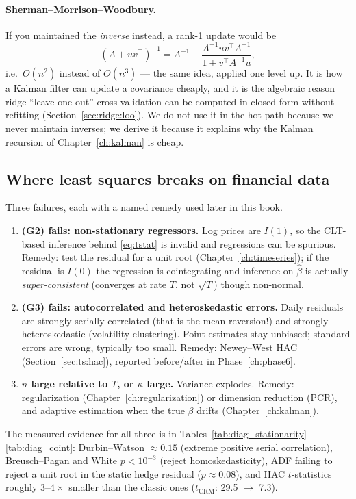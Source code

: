 \paragraph{Sherman--Morrison--Woodbury.} If you maintained the \emph{inverse} instead, a
rank-1 update would be
\begin{equation}
  (A+uv^{\top})^{-1} = A^{-1} - \frac{A^{-1}uv^{\top}A^{-1}}{1+v^{\top}A^{-1}u},
  \label{eq:shermanmorrison}
\end{equation}
i.e.\ $O(n^2)$ instead of $O(n^3)$ --- the same idea, applied one level up. It is how a
Kalman filter can update a covariance cheaply, and it is the algebraic reason ridge
``leave-one-out'' cross-validation can be computed in closed form without refitting
(Section~\ref{sec:ridge:loo}). We do not use it in the hot path because we never maintain
inverses; we derive it because it explains why the Kalman recursion of
Chapter~\ref{ch:kalman} is cheap.

\subsection{Where least squares breaks on financial data}
\label{sec:ols:breaks}

Three failures, each with a named remedy used later in this book.

\begin{enumerate}
  \item \textbf{(G2) fails: non-stationary regressors.} Log prices are $I(1)$, so the
    CLT-based inference behind \eqref{eq:tstat} is invalid and regressions can be
    spurious. Remedy: test the residual for a unit root
    (Chapter~\ref{ch:timeseries}); if the residual is $I(0)$ the regression is
    cointegrating and inference on $\hat\beta$ is actually \emph{super-consistent}
    (converges at rate $T$, not $\sqrt T$) though non-normal.
  \item \textbf{(G3) fails: autocorrelated and heteroskedastic errors.} Daily residuals
    are strongly serially correlated (that is the mean reversion!) and strongly
    heteroskedastic (volatility clustering). Point estimates stay unbiased; standard
    errors are wrong, typically too small. Remedy: Newey--West HAC
    (Section~\ref{sec:ts:hac}), reported before/after in Phase~\ref{ch:phase6}.
  \item \textbf{$n$ large relative to $T$, or $\kappa$ large.} Variance explodes.
    Remedy: regularization (Chapter~\ref{ch:regularization}) or dimension reduction
    (PCR), and adaptive estimation when the true $\beta$ drifts
    (Chapter~\ref{ch:kalman}).
\end{enumerate}

The measured evidence for all three is in
Tables~\ref{tab:diag_stationarity}--\ref{tab:diag_coint}: Durbin--Watson $\approx0.15$
(extreme positive serial correlation), Breusch--Pagan and White $p<10^{-3}$ (reject
homoskedasticity), ADF failing to reject a unit root in the static hedge residual
($p\approx0.08$), and HAC $t$-statistics roughly $3$--$4\times$ smaller than the classic
ones ($t_{\text{CRM}}$: 29.5 $\rightarrow$ 7.3).
